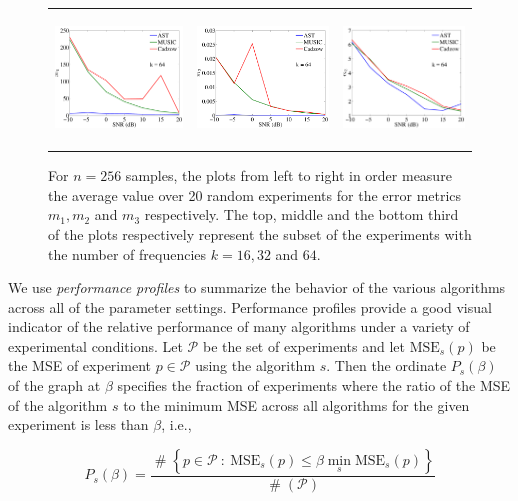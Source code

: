 \begin{figure}[htbp]
\begin{tabular}{ccc}
	\includegraphics[height=35mm]{figures/mSNR1_64.pdf} &
	\includegraphics[height=35mm]{figures/mSNR2_64.pdf} &
	\includegraphics[height=35mm]{figures/mSNR3_64.pdf}
\end{tabular}
\caption{For $n = 256$ samples, the plots from left to right in order measure the average value over 20 random experiments for the error metrics $m_1, m_2$ and $m_3$ respectively. The top, middle and the bottom third of the plots respectively represent the subset of the experiments
with the number of frequencies $k=16, 32$ and $64$.}
\label{fig:msnr}
\end{figure}


We use \emph{performance profiles} to summarize the behavior of the various
algorithms across all of the parameter settings. Performance profiles provide a
good visual indicator of the relative performance of many algorithms under a
variety of experimental conditions\cite{dolanmore02}. Let $\mathcal{P}$ be the
set of experiments and let $\mathrm{MSE}_s(p)$ be the MSE of experiment $p \in
\mathcal{P}$ using the algorithm $s$. Then the ordinate $P_s(\beta)$ of the
graph at $\beta$ specifies the fraction of experiments where the ratio of the
MSE of the algorithm $s$ to the minimum MSE across all algorithms for the given
experiment is less than $\beta$, i.e.,

\begin{equation*}
P_s(\beta) = \frac{\mathop{\#}\left\{p \in \mathcal{P} ~:~ \mathrm{MSE}_s(p) \leq \beta \min_s \mathrm{MSE}_s(p)\right\}}{\mathop{\#}(\mathcal{P})}
\end{equation*}

